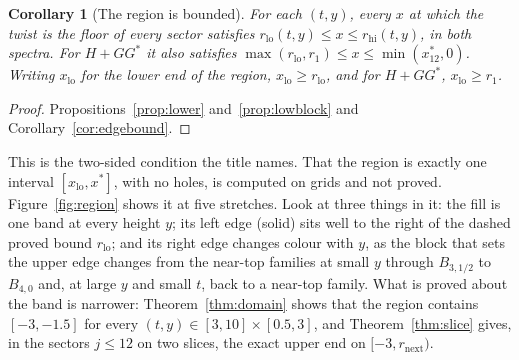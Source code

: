 \documentclass[11pt]{article}
\newtheorem{corollary}[theorem]{Corollary}
\theoremstyle{definition}
\theoremstyle{remark}
\begin{document}
\begin{corollary}[The region is bounded]\label{cor:interval}
For each $(t,y)$, every $x$ at which the twist is the floor of every sector satisfies
$r_{\mathrm{lo}}(t,y)\le x\le r_{\mathrm{hi}}(t,y)$, in both spectra. For $H+GG^*$ it also satisfies
$\max(r_{\mathrm{lo}},r_1)\le x\le\min(x^*_{12},0)$. Writing $x_{\mathrm{lo}}$ for the lower end of the region,
$x_{\mathrm{lo}}\ge r_{\mathrm{lo}}$, and for $H+GG^*$, $x_{\mathrm{lo}}\ge r_1$.
\end{corollary}

\begin{proof}
Propositions~\ref{prop:lower} and~\ref{prop:lowblock} and Corollary~\ref{cor:edgebound}.
\end{proof}

This is the two-sided condition the title names. That the region is exactly one interval $[x_{\mathrm{lo}},x^*]$, with
no holes, is computed on grids and not proved. Figure~\ref{fig:region} shows it at five stretches. Look at three
things in it: the fill is one band at every height $y$; its left edge (solid) sits well to the right of the dashed
proved bound $r_{\mathrm{lo}}$; and its right edge changes colour with $y$, as the block that sets the upper edge
changes from the near-top families at small $y$ through $B_{3,1/2}$ to $B_{4,0}$ and, at large $y$ and small $t$, back to
a near-top family. What is proved about the band is narrower: Theorem~\ref{thm:domain} shows that the region contains
$[-3,-1.5]$ for every $(t,y)\in[3,10]\times[0.5,3]$, and Theorem~\ref{thm:slice} gives, in the sectors $j\le12$ on two
slices, the exact upper end on $[-3,r_{\mathrm{next}})$.
\end{document}
